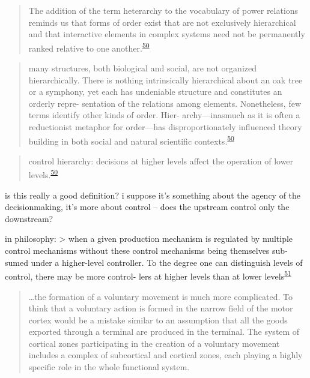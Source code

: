 \documentclass[
  a4paper,
]{article}
\begin{document}
\begin{quote}
The addition of the term heterarchy to the vocabulary of power relations
reminds us that forms of order exist that are not exclusively
hierarchical and that interactive elements in complex systems need not
be permanently ranked relative to one
another.\textsuperscript{\protect\hyperlink{ref-crumleyHeterarchyAnalysisComplex2008}{50}}
\end{quote}

\begin{quote}
many structures, both biological and social, are not organized
hierarchically. There is nothing intrinsically hierarchical about an oak
tree or a symphony, yet each has undeniable structure and constitutes an
orderly repre- sentation of the relations among elements. Nonetheless,
few terms identify other kinds of order. Hier- archy---inasmuch as it is
often a reductionist metaphor for order---has disproportionately
influenced theory building in both social and natural scientific
contexts.\textsuperscript{\protect\hyperlink{ref-crumleyHeterarchyAnalysisComplex2008}{50}}
\end{quote}

\begin{quote}
control hierarchy: decisions at higher levels affect the operation of
lower
levels.\textsuperscript{\protect\hyperlink{ref-crumleyHeterarchyAnalysisComplex2008}{50}}
\end{quote}

is this really a good definition? i suppose it's something about the
agency of the decisionmaking, it's more about control -- does the
upstream control only the downstream?

in philosophy: \textgreater{} when a given production mechanism is
regulated by multiple control mechanisms without these control
mechanisms being themselves sub- sumed under a higher-level controller.
To the degree one can distinguish levels of control, there may be more
control- lers at higher levels than at lower
levels\textsuperscript{\protect\hyperlink{ref-bechtelGroundingCognitionHeterarchical2021}{51}}

\begin{quote}
\ldots the formation of a voluntary movement is much more complicated.
To think that a voluntary action is formed in the narrow field of the
motor cortex would be a mistake similar to an assumption that all the
goods exported through a terminal are produced in the terminal. The
system of cortical zones participating in the creation of a voluntary
movement includes a complex of subcortical and cortical zones, each
playing a highly specific role in the whole functional system.
\end{quote}
\end{document}
